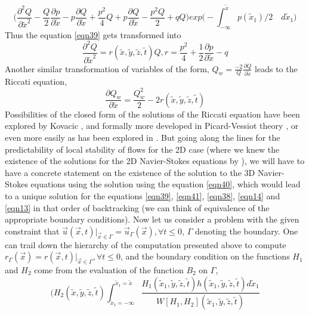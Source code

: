 \documentclass{article}
\begin{document}
\begin{equation*}
\bigg(\frac{\partial^2 Q}{\partial \tilde{x}^2}-\frac{Q}{2}\frac{\partial p}{\partial \tilde{x}}-p\frac{\partial Q}{\partial \tilde{x}}+\frac{p^2}{4}Q+p\frac{\partial Q}{\partial \tilde{x}}-\frac{p^2 Q}{2}+qQ\bigg)exp\bigg(-\int_{-\infty}^{\tilde{x}} p(\tilde{x}_1)/2 \quad d\tilde{x}_1\bigg)
\end{equation*}
Thus the equation \ref{eqn39} gets transformed into
\begin{equation}
\frac{\partial^2 Q}{\partial \tilde{x}^2} = r(\tilde{x},\tilde{y},\tilde{z},\tilde{t})Q, r = \frac{p^2}{4} + \frac{1}{2} \frac{\partial p}{\partial \tilde{x}} - q
\end{equation}
Another similar transformation of variables of the form, $Q_w = \frac{-2}{Q} \frac{\partial Q}{\partial \tilde{x}}$ leads to the Riccati equation,
\begin{equation} \label{eqn40}
\frac{\partial Q_w}{\partial \tilde{x}} = \frac{Q_w^2}{2} - 2r(\tilde{x},\tilde{y},\tilde{z},\tilde{t})
\end{equation}
Possibilities of the closed form of the solutions of the Riccati equation have been explored by Kovacic \cite{kovacic}, and formally more developed in Picard-Vessiot theory \cite{galoistheory}, or even more easily as has been explored in \cite{pala}. But going along the lines for the predictability of local stability of flows for the 2D case (where we knew the existence of the solutions for the 2D Navier-Stokes equations by \cite{exactSolution}), we will have to have a concrete statement on the existence of the solution to the 3D Navier-Stokes equations using the solution using the equation \ref{eqn40}, which would lead to a unique solution for the equations \ref{eqn39}, \ref{eqn41}, \ref{eqn38}, \ref{eqn14} and \ref{eqn13} in that order of backtracking (we can think of equivalence of the appropriate boundary conditions). Now let us consider a problem with the given constraint that $\vec{u}(\vec{x}, t)|_{\vec{x} \in \Gamma} = \vec{u}_{\Gamma}(\vec{x}), \forall t \le 0$, $\Gamma$ denoting the boundary. One can trail down the hierarchy of the computation presented above to compute $r_{\Gamma}(\vec{x}) = r(\vec{x}, t)|_{\vec{x} \in \Gamma}, \forall t \le 0$, and the boundary condition on the functions $H_1$ and $H_2$ come from the evaluation of the function $B_2$ on $\Gamma$,
\begin{equation*}
\bigg(H_2(\tilde{x}, \tilde{y}, \tilde{z}, \tilde{t}) \int_{\tilde{x}_1 = -\infty}^{\tilde{x}_1 = \tilde{x}} \frac{H_1(\tilde{x}_1, \tilde{y}, \tilde{z}, \tilde{t})h(\tilde{x}_1, \tilde{y}, \tilde{z}, \tilde{t})d\tilde{x}_1}{W[H_1, H_2](\tilde{x}_1, \tilde{y}, \tilde{z}, \tilde{t})}
\end{equation*}
\end{document}
